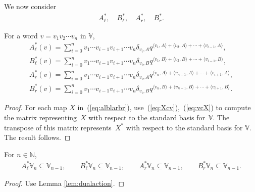 We now consider
\begin{gather}\label{eq:AlBl}
A^*_\ell, \quad B^*_\ell, \quad A^*_r,\quad B^*_r.
\end{gather}

\begin{Lemma}\label{lem:dualaction}For a word $v=v_1v_2\cdots v_n$ in $\mathbb V$,
\begin{gather*}
A^*_\ell(v) = \sum_{i=0}^n
 v_1 \cdots v_{i-1}
	 v_{i+1}\cdots v_n
	 \delta_{v_i,A}
	 q^{\langle v_1,A\rangle+ \langle v_2, A\rangle + \cdots +
	 \langle v_{i-1},A\rangle},
\\
B^*_\ell(v) = \sum_{i=0}^n
 v_1 \cdots v_{i-1}
	 v_{i+1}\cdots v_n
	 \delta_{v_i,B}
	 q^{\langle v_1,B\rangle+ \langle v_2, B\rangle + \cdots +
	 \langle v_{i-1},B\rangle},
\\
A^*_r(v) = \sum_{i=0}^n
 v_1 \cdots v_{i-1}
	 v_{i+1}\cdots v_n
	 \delta_{v_i,A}
	 q^{\langle v_n,A\rangle+ \langle v_{n-1}, A\rangle + \cdots +
	 \langle v_{i+1},A\rangle},
\\
B^*_r(v) = \sum_{i=0}^n
 v_1 \cdots v_{i-1}
	 v_{i+1}\cdots v_n
	 \delta_{v_i,B}
	 q^{\langle v_n,B\rangle+ \langle v_{n-1}, B\rangle + \cdots +
	 \langle v_{i+1},B\rangle}.
\end{gather*}
\end{Lemma}
\begin{proof} For each map $X$ in~(\ref{eq:alblarbr}), use~(\ref{eq:Xcv}),~(\ref{eq:vcX})
to compute the matrix representing~$X$
with respect to the standard basis for~$\mathbb V$.
The transpose of this matrix represents~$X^*$
with respect to the standard basis for $\mathbb V$.
The result follows.
\end{proof}

\begin{Lemma}\label{lem:ABLower2}
For $n \in \mathbb N$,
\begin{gather*}
A^*_{\ell} \mathbb V_n \subseteq \mathbb V_{n-1},
\qquad
B^*_{\ell} \mathbb V_n \subseteq \mathbb V_{n-1},
\qquad
A^*_{r} \mathbb V_n \subseteq \mathbb V_{n-1},
\qquad
B^*_{r} \mathbb V_n \subseteq \mathbb V_{n-1}.
\end{gather*}
\end{Lemma}
\begin{proof}Use
Lemma \ref{lem:dualaction}.
\end{proof}

